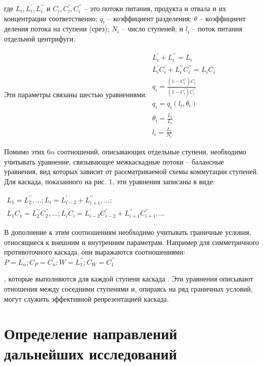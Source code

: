 где $L_{i}, L_{i}^{\prime}, L_{i}^{\prime \prime}$ и $C_{i}, C_{i}^{\prime}, C_{i}^{\prime \prime}$ -- 
это потоки питания, продукта и отвала и их концентрации соответственно; $q_{i}$ -- коэффициент разделения; $\theta$ -- коэффициент деления потока на ступени (срез); $N_{i}$ -- число ступеней; и $l_{i}$ -- поток питания отдельной центрифуги.

Эти параметры связаны шестью уравнениями:
$\begin{array}{c}
  {L_{i}^{\prime}+L_{i}^{\prime \prime}=L_{i}} \\
  {L_{i}^{\prime} C_{i}^{\prime}+L_{i}^{\prime \prime} C_{i}^{\prime \prime}=L_{i} C_{i}} \\
  {q_{i}=\frac{(1-C_{i}^{\prime \prime}) C_{i}^{\prime}}{(1-C_{i}^{\prime}) C_{i}^{\prime \prime}}} \\
  {q_{i}=q_{i}\left(l_{i}, \theta_{i}\right)} \\
  {\theta_{i}=\frac{L_{i}^{\prime}}{L_{i}}} \\
  {l_{i}=\frac{L_{i}}{N_{i}}}
\end{array}$


Помимо этих 6$n$ соотношений, описывающих отдельные ступени, необходимо учитывать уравнение, связывающее межкаскадные потоки -- балансные уравнения, вид которых зависит от рассматриваемой схемы коммутации ступеней. Для каскада, показанного на рис. 1, эти уравнения записаны в виде:

$\begin{array}{c}
  {L_{1}=L_{2}^{\prime \prime}, \ldots ; L_{i}=L_{i-2}^{\prime}+L_{i+1}^{\prime \prime}, \ldots ;} \\
  {L_{1} C_{1}=L_{2}^{\prime \prime} C_{2}^{\prime \prime}, \ldots ; L_{i} C_{i}=L_{i-2}^{\prime} C_{i-2}^{\prime}+L_{i+1}^{\prime \prime} C_{i+1}^{\prime \prime}, \ldots}
\end{array}$

В дополнение к этим соотношениям необходимо учитывать граничные условия, относящиеся к внешним и внутренним параметрам. Например для симметричного противоточного каскада, они выражаются соотношениями: 
$P=L_{n}^{\prime} ; C_{P}=C_{n}^{\prime} ; W=L_{1}^{\prime \prime} ; C_{W}=C_{1}^{\prime \prime}$

, которые выполняются для каждой ступени каскада \cite{palkinDeterminationOptimalParameters2012}. Эти уравнения описывают отношения между соседними ступенями и, опираясь на ряд граничных условий, могут служить эффективной репрезентацией каскада.


\section{Определение направлений дальнейших исследований}


